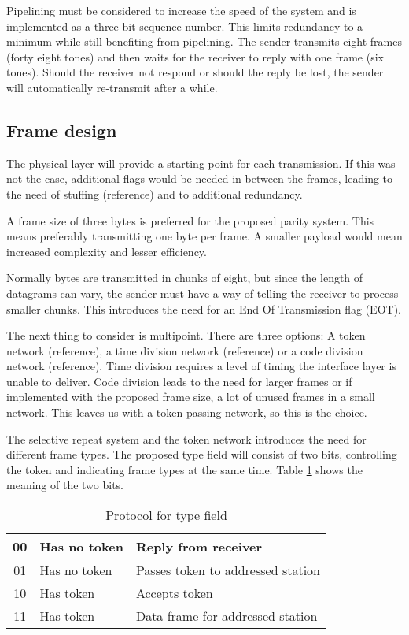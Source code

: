 Pipelining must be considered to increase the speed of the system and is
implemented as a three bit sequence number. This limits redundancy to a minimum
while still benefiting from pipelining. The sender transmits eight frames
(forty eight tones) and then waits for the receiver to reply with one frame
(six tones). Should the receiver not respond or should the reply be lost, the
sender will automatically re-transmit after a while.

\subsection{Frame design}\label{dll_frame_design}
The physical layer will provide a starting point for each
transmission. If this was not the case,
additional flags would be needed in between the frames, leading to the
need of stuffing (reference) and to additional redundancy.

A frame size of three bytes is preferred for the proposed parity system. This
means preferably transmitting one byte per frame. A smaller payload would mean
increased complexity and lesser efficiency.

Normally bytes are transmitted in chunks of eight, but since the length of
datagrams can vary, the sender must have a way of telling the receiver to process smaller
chunks. This introduces the need for an End Of Transmission flag (EOT).

The next thing to consider is multipoint. There are three options: A token
network (reference), a time division network (reference) or a code division
network (reference). Time division requires a level of timing the interface layer
is unable to deliver. Code division leads to the need for larger frames or if implemented with the
proposed frame size, a lot of unused frames in a small network. This leaves us
with a token passing network, so this is the choice.

The selective repeat system and the token network introduces the need for
different frame types. The proposed type field will consist of two bits, controlling the token and indicating frame types at the same time. Table \ref{tab:protocol_for_type_field} shows the meaning of the two bits.

\begin{table}[htb]
	\centering
	\begin{tabular}{|c|ll|}
		\hline
		00 & Has no token & Reply from receiver \\
		\hline
		01 & Has no token & Passes token to addressed station \\
		\hline
		10 & Has token & Accepts token \\
		\hline
		11 & Has token & Data frame for addressed station \\
		\hline
	\end{tabular}
	\caption{Protocol for type field}
	\label{tab:protocol_for_type_field}
\end{table}

